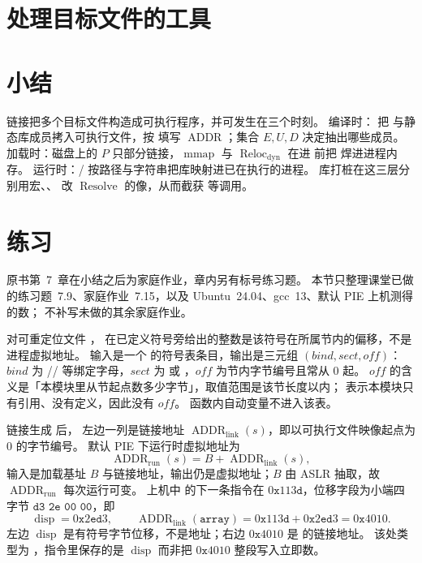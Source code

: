 \section{处理目标文件的工具}

\pending

\section{小结}

链接把多个目标文件构造成可执行程序，并可发生在三个时刻。
编译时： 把  与静态库成员拷入可执行文件，按  填写 $\operatorname{ADDR}$；集合 $E,U,D$ 决定抽出哪些成员。
加载时：磁盘上的 $P$ 只部分链接，$\operatorname{mmap}$ 与 $\operatorname{Reloc}_{\mathrm{dyn}}$ 在进  前把  焊进进程内存。
运行时：/ 按路径与字符串把库映射进已在执行的进程。
库打桩在这三层分别用宏、、 改 $\operatorname{Resolve}$ 的像，从而截获  等调用。

\section{练习}

原书第~7~章在小结之后为家庭作业，章内另有标号练习题。
本节只整理课堂已做的练习题~7.9、家庭作业~7.15，以及 Ubuntu~24.04、gcc~13、默认 PIE 上机测得的数；
不补写未做的其余家庭作业。

对可重定位文件 ， 在已定义符号旁给出的整数是该符号在所属节内的偏移，不是进程虚拟地址。
输入是一个  的符号表条目，输出是三元组 $(\textit{bind},\textit{sect},\textit{off})$：
$\textit{bind}$ 为 // 等绑定字母，$\textit{sect}$ 为  或 ，$\textit{off}$ 为节内字节编号且常从 $0$ 起。
$\textit{off}$ 的含义是「本模块里从节起点数多少字节」，取值范围是该节长度以内；
 表示本模块只有引用、没有定义，因此没有 $\textit{off}$。
函数内自动变量不进入该表。

链接生成  后， 左边一列是链接地址 $\operatorname{ADDR}_{\mathrm{link}}(s)$，即以可执行文件映像起点为 $0$ 的字节编号。
默认 PIE 下运行时虚拟地址为
\[
\operatorname{ADDR}_{\mathrm{run}}(s)=B+\operatorname{ADDR}_{\mathrm{link}}(s),
\]
输入是加载基址 $B$ 与链接地址，输出仍是虚拟地址；$B$ 由 ASLR 抽取，故 $\operatorname{ADDR}_{\mathrm{run}}$ 每次运行可变。
上机中  的下一条指令在 $0\texttt{x}113\texttt{d}$，位移字段为小端四字节 $\texttt{d3 2e 00 00}$，即
\[
\operatorname{disp}=0\texttt{x}2\texttt{ed}3,
\qquad
\operatorname{ADDR}_{\mathrm{link}}(\texttt{array})=0\texttt{x}113\texttt{d}+0\texttt{x}2\texttt{ed}3=0\texttt{x}4010.
\]
左边 $\operatorname{disp}$ 是有符号字节位移，不是地址；右边 $0\texttt{x}4010$ 是  的链接地址。
该处类型为 ，指令里保存的是 $\operatorname{disp}$ 而非把 $0\texttt{x}4010$ 整段写入立即数。

